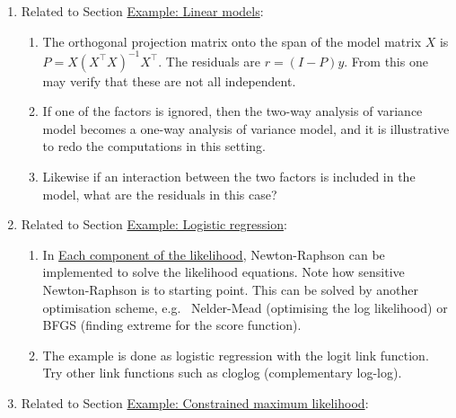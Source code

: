 \begin{enumerate}
\def\labelenumi{\arabic{enumi}.}
\tightlist
\item
  Related to Section \protect\hyperlink{example-linear-models}{Example: Linear models}:

  \begin{enumerate}
  \def\labelenumii{\alph{enumii})}
  \tightlist
  \item
    The orthogonal projection
    matrix onto the span of the model matrix \(X\) is \(P=X (X^\top X)^{-1}X^\top\). The residuals are \(r=(I-P)y\). From this one may
    verify that these are not all independent.
  \item
    If one of the factors
    is ignored, then the two-way analysis of variance
    model becomes a one-way analysis of variance
    model, and it is illustrative to redo the computations in this setting.
  \item
    Likewise if an interaction between the two factors
    is included in the model, what are the residuals in this case?
  \end{enumerate}
\item
  Related to Section \protect\hyperlink{example-logistic-regression}{Example: Logistic regression}:

  \begin{enumerate}
  \def\labelenumii{\alph{enumii})}
  \tightlist
  \item
    In \protect\hyperlink{each-component-of-the-likelihood}{Each component of the
    likelihood}, Newton-Raphson can be implemented to solve the likelihood
    equations.
    Note how sensitive Newton-Raphson is to starting point.
    This can be solved by another optimisation scheme, e.g.~
    Nelder-Mead (optimising the log likelihood) or BFGS
    (finding extreme for the score function).
  \item
    The example is done as logistic regression with the logit
    link function. Try other link functions such as cloglog (complementary log-log).
  \end{enumerate}
\item
  Related to Section \protect\hyperlink{example-constrained-maximum-likelihood}{Example: Constrained maximum likelihood}:


\end{enumerate}
